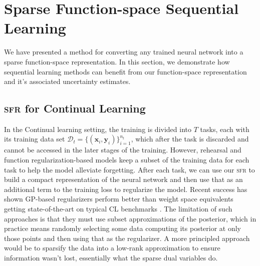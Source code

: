 \documentclass{article}
\newcommand{\our}{\textsc{sfr}\xspace}
\newcommand{\dataset}{\ensuremath{\mathcal{D}}}
\begin{document}
\section{Sparse Function-space Sequential Learning}

We have presented a method for converting any trained neural network into a sparse function-space representation.
In this section, we demonstrate how sequential learning methods can benefit from our function-space representation and it's associated uncertainty estimates.



\subsection{\our for Continual Learning}
In the Continual learning setting, the training is divided into $T$ tasks, each with its training data set $\dataset_t = \{(\mathbf{x}_{i}, \mathbf{y}_{i})\}_{i=1}^{n_t}$, which after the task is discarded and cannot be accessed in the later stages of the training. However, rehearsal and function regularization-based models keep a subset of the training data for each task to help the model alleviate forgetting. After each task, we can use our \our to build a compact representation of the neural network and then use that as an additional term to the training loss to regularize the model. Recent success has shown GP-based regularizers perform better than weight space equivalents getting state-of-the-art on typical CL benchmarks \cite{ pan2020continual, rudner2022continual}. The limitation of such approaches is that they must use subset approximations of the posterior, which in practice means randomly selecting some data computing its posterior at only those points and then using that as the regularizer. A more principled approach would be to sparsify the data into a low-rank approximation to ensure information wasn't lost, essentially what the sparse dual variables do.   
\end{document}

